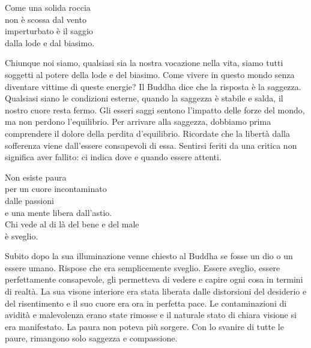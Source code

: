 
\begin{dhpVerse}{81}
\label{dhp-81}
Come una solida roccia\\
non \`{e} scossa dal vento\\
imperturbato \`{e} il saggio\\
dalla lode e dal biasimo.
\end{dhpVerse}

\begin{dhpRefl}
Chiunque noi siamo, qualsiasi sia la nostra vocazione nella vita, siamo tutti soggetti al potere della lode e del biasimo.  Come vivere in questo mondo senza diventare vittime di queste energie? Il Buddha dice che la risposta \`{e} la saggezza. Qualsiasi siano le condizioni esterne, quando la saggezza \`{e} stabile e salda, il nostro cuore resta fermo. Gli esseri saggi sentono l'impatto delle forze del mondo, ma non perdono l'equilibrio. Per arrivare alla saggezza, dobbiamo prima comprendere il dolore della perdita d'equilibrio. Ricordate che la libert\`{a} dalla sofferenza viene dall'essere consapevoli di essa. Sentirsi feriti da una critica non significa aver fallito: ci indica dove e quando essere attenti.
\end{dhpRefl}


\begin{dhpVerse}{39}
\label{dhp-39}
Non esiste paura\\
per un cuore incontaminato\\
dalle passioni\\
e una mente libera dall'astio.\\
Chi vede al di l\`{a} del bene e del male\\
\`{e} sveglio.
\end{dhpVerse}

\begin{dhpRefl}
Subito dopo la sua illuminazione venne chiesto al Buddha se fosse un dio o un essere umano. Rispose che era semplicemente sveglio. Essere sveglio, essere perfettamente consapevole, gli permetteva di vedere e capire ogni cosa in termini di realt\`{a}. La sua visone interiore era stata liberata dalle distorsioni del desiderio e del risentimento e il suo cuore era ora in perfetta pace. Le contaminazioni di avidit\`{a} e malevolenza erano state rimosse e il naturale stato di chiara visione si era manifestato. La paura non poteva più sorgere. Con lo svanire di tutte le paure, rimangono solo saggezza e compassione.
\end{dhpRefl}

